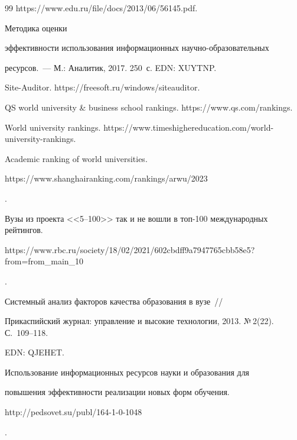 {{\begin{thebibliography}{99}
{https://www.edu.ru/file/docs/2013/06/56145.pdf}.




   Методика оценки 


эффективности использования информационных на\-уч\-но-об\-ра\-зо\-ва\-тель\-ных 


ресурсов.~--- М.: Аналитик, 2017. 250~с. EDN: XUYTNP.


  




  Site-Auditor. {\sf https://freesoft.ru/windows/siteauditor}.




  QS world university \& business school rankings. {\sf  https://www.qs.com/rankings}.




  World university rankings. {\sf https://www.timeshighereducation.com/world-university-rankings}.




  Academic ranking of world universities. {\sf 


https://www.shanghairanking.com/rankings/\linebreak arwu/2023}.




  Вузы из проекта <<5--100>> так и не вошли в топ-100 международных рейтингов. {\sf 


https://www.rbc.ru/society/18/02/2021/602cbdff9a7947765cbb58e5?from=from\_\linebreak main\_10}. 




   Системный анализ факторов качества образования в вузе~/\!\!/  


Прикаспийский журнал: управ\-ле\-ние и высокие технологии, 2013. №\,2(22). С.~109--118. 


EDN: QJEHET.




   Использование информационных ресурсов науки и образования для 


повышения эффективности реализации новых форм обучения. {\sf  


http://pedsovet.su/publ/164-1-0-1048}.



\end{thebibliography}}}
